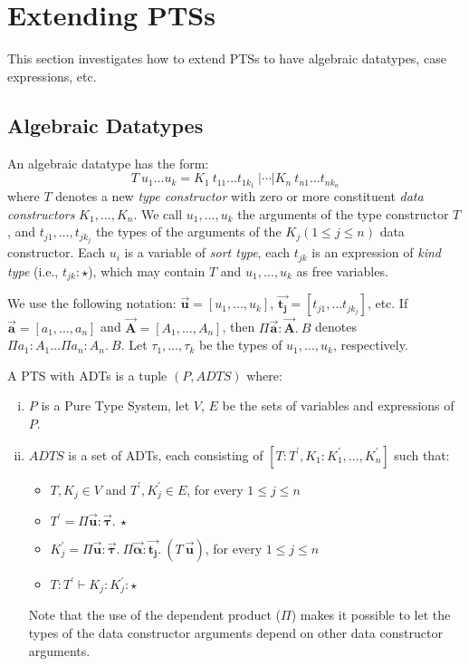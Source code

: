 \documentclass[oneside,a4paper]{article}
\numberwithin{equation}{section}
\begin{document}
\section{Extending PTSs }

This section investigates how to extend PTSs to have algebraic
datatypes, case expressions, etc.

\subsection{Algebraic Datatypes}

An algebraic datatype has the form:
\[
T \ u_{1} \dots u_{k} = K_{1} \ t_{11} \dots t_{1k_{1}} \ | \cdots |
K_{n} \ t_{n1} \dots t_{nk_{n}}
\]
where $T$ denotes a new \emph{type constructor} with zero or more
constituent \emph{data constructors} $K_{1}, \dots, K_{n}$. We call
$u_{1}, \dots, u_{k}$ the arguments of the type constructor $T$, and
$t_{j1}, \dots, t_{jk_{j}}$ the types of the arguments of the
$K_{j} (1 \leqslant j \leqslant n)$ data constructor. Each $u_{i}$ is
a variable of \emph{sort type}, each $t_{jk}$ is an expression of
\emph{kind type} (i.e., $t_{jk} : \star$), which may contain $T$ and
$u_{1}, \dots, u_{k}$ as free variables.

We use the following notation:
$\vec{\mathbf{u}} = [u_{1}, \dots, u_{k}]$,
$\vec{\mathbf{t_{j}}} = [t_{j1}, \dots t_{jk_{j}}]$, etc. If
$\vec{\mathbf{a}} = [a_{1}, \dots, a_{n}]$ and
$\vec{\mathbf{A}} = [A_{1}, \dots, A_{n}]$, then
$\Pi \vec{\mathbf{a}} : \vec{\mathbf{A}}.\ B$ denotes
$\Pi a_{1}:A_{1} \dots \Pi a_{n}:A_{n}.\ B$. Let
$\tau_{1},\dots,\tau_{k}$ be the types of $u_{1}, \dots, u_{k}$,
respectively.

A PTS with ADTs is a tuple $(P, ADTS)$ where:

\begin{enumerate}[(i)]
\item $P$ is a Pure Type System, let $V$, $E$ be the sets of variables
  and expressions of $P$.
\item $ADTS$ is a set of ADTs, each consisting of
  $[T : T^{\prime}, K_{1} : K_{1}^{\prime}, \dots, K_{n}^{\prime}]$
  such that:
  \begin{itemize}
  \item $T, K_{j} \in V$ and $T^{\prime}, K_{j}^{\prime} \in E$, for
    every $1 \leqslant j \leqslant n$
  \item
    $T^{\prime} = \Pi \vec{\mathbf{u}} : \vec{\mathbf{\tau}}.\ \star$
  \item
    $K_{j}^{\prime} = \Pi \vec{\mathbf{u}} : \vec{\mathbf{\tau}}.\ \Pi
    \vec{\mathbf{\alpha}}: \vec{\mathbf{t_{j}}}.\ (T\
    \vec{\mathbf{u}}) $, for every $1 \leqslant j \leqslant n$
  \item $T : T^{\prime} \vdash K_{j} : K_{j}^{\prime} : \star$
  \end{itemize}
  Note that the use of the dependent product ($\Pi$) makes it possible
  to let the types of the data constructor arguments depend on other
  data constructor arguments.
\end{enumerate}





\nocite{*}  
\end{document}
